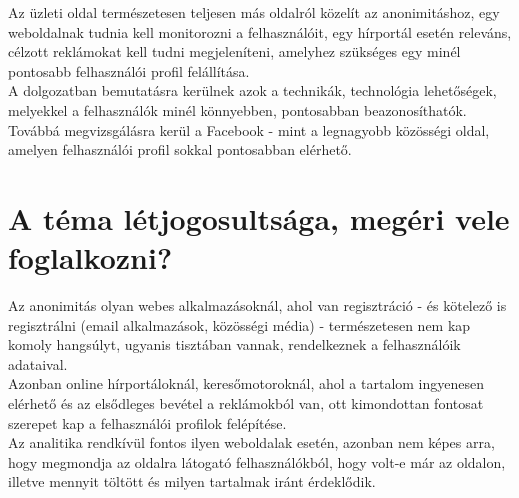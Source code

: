 Az üzleti oldal természetesen teljesen más oldalról közelít az anonimitáshoz, egy weboldalnak tudnia kell monitorozni a felhasználóit, egy hírportál esetén releváns, célzott reklámokat kell tudni megjeleníteni, amelyhez szükséges egy minél pontosabb felhasználói profil felállítása.\\
A dolgozatban bemutatásra kerülnek azok a technikák, technológia lehetőségek, melyekkel a felhasználók minél könnyebben, pontosabban beazonosíthatók. Továbbá megvizsgálásra kerül a Facebook - mint a legnagyobb közösségi oldal, amelyen felhasználói profil sokkal pontosabban elérhető.
\section{A téma létjogosultsága, megéri vele foglalkozni?} %
\label{sec:a_téma_létjogosultsága}
Az anonimitás olyan webes alkalmazásoknál, ahol van regisztráció - és kötelező is regisztrálni (email alkalmazások, közösségi média) - természetesen nem kap komoly hangsúlyt, ugyanis tisztában vannak, rendelkeznek a felhasználóik adataival.\\
Azonban online hírportáloknál, keresőmotoroknál, ahol a tartalom ingyenesen elérhető és az elsődleges bevétel a reklámokból van, ott kimondottan fontosat szerepet kap a felhasználói profilok felépítése.\\
Az analitika rendkívül fontos ilyen weboldalak esetén, azonban nem képes arra, hogy megmondja az oldalra látogató felhasználókból, hogy volt-e már az oldalon, illetve mennyit töltött és milyen tartalmak iránt érdeklődik.


